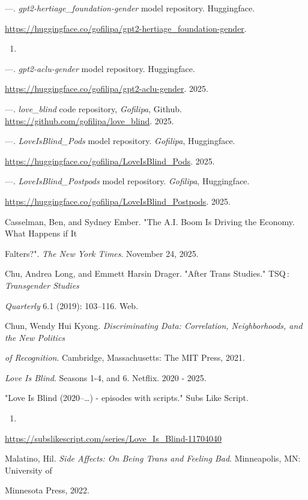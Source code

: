 \documentclass[11pt]{article}
\begin{document}
---. \emph{gpt2-hertiage\_foundation-gender} model repository. Huggingface.

\url{https://huggingface.co/gofilipa/gpt2-hertiage\_foundation-gender}.
\begin{enumerate}
\item 
\end{enumerate}

---. \emph{gpt2-aclu-gender} model repository. Huggingface.

\url{https://huggingface.co/gofilipa/gpt2-aclu-gender}. 2025.

---. \emph{love\_blind} code repository, \emph{Gofilipa}, Github.
\url{https://github.com/gofilipa/love\_blind}. 2025.

---. \emph{LoveIsBlind\_Pods} model repository. \emph{Gofilipa}, Huggingface.

\url{https://huggingface.co/gofilipa/LoveIsBlind\_Pods}. 2025.

---. \emph{LoveIsBlind\_Postpods} model repository. \emph{Gofilipa}, Huggingface.

\url{https://huggingface.co/gofilipa/LoveIsBlind\_Postpods}. 2025.

Casselman, Ben, and Sydney Ember. "The A.I. Boom Is Driving the Economy.
What Happens if It

Falters?". \emph{The New York Times}. November 24, 2025.

Chu, Andrea Long, and Emmett Harsin Drager. "After Trans Studies." TSQ :
\emph{Transgender Studies}

\emph{Quarterly} 6.1 (2019): 103--116. Web.

Chun, Wendy Hui Kyong. \emph{Discriminating Data: Correlation, Neighborhoods,
and the New Politics}

\emph{of Recognition}. Cambridge, Massachusetts: The MIT Press, 2021.

\emph{Love Is Blind}. Seasons 1-4, and 6. Netflix. 2020 - 2025.

"Love Is Blind (2020--\ldots{}) - episodes with scripts." Subs Like Script.
\begin{enumerate}
\item 
\end{enumerate}

\url{https://subslikescript.com/series/Love\_Is\_Blind-11704040}

Malatino, Hil. \emph{Side Affects: On Being Trans and Feeling Bad}.
Minneapolis, MN: University of

Minnesota Press, 2022.
\end{document}
